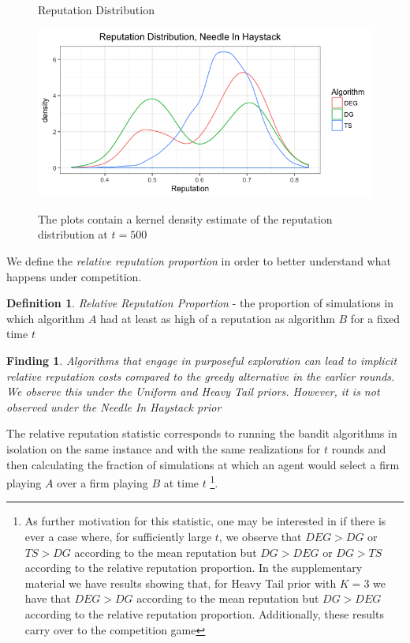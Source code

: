 \documentclass{article}
\theoremstyle{definition}
\newtheorem{definition}{Definition}
\newtheorem{finding}{Finding}
\begin{document}
\begin{figure}
\caption{Reputation Distribution}
\includegraphics[scale=0.35]{figures/rep_distribution_nih}
\label{rep_dist_nih}
\caption*{\tiny{The plots contain a kernel density estimate of the reputation distribution at $t = 500$}}
\end{figure} 


We define the \textit{relative reputation proportion} in order to better understand what happens under competition.

\begin{definition}
\textit{Relative Reputation Proportion} - the proportion of simulations in which algorithm $A$ had at least as high of a reputation as algorithm $B$ for a fixed time $t$
\end{definition}


\begin{finding}
\textit{Algorithms that engage in purposeful exploration can lead to implicit relative reputation costs compared to the greedy alternative in the earlier rounds. We observe this under the Uniform and Heavy Tail priors. However, it is not observed under the Needle In Haystack prior}
\end{finding}

The relative reputation statistic corresponds to running the bandit algorithms in isolation on the same instance and with the same realizations for $t$ rounds and then calculating the fraction of simulations at which an agent would select a firm playing $A$ over a firm playing $B$ at time $t$ \footnote{As further motivation for this statistic, one may be interested in if there is ever a case where, for sufficiently large $t$, we observe that $DEG >DG$ or $TS > DG$ according to the mean reputation but $DG > DEG$ or $DG > TS$ according to the relative reputation proportion. In the supplementary material we have results showing that, for Heavy Tail prior with $K=3$ we have that $DEG > DG$ according to the mean reputation but $DG > DEG$ according to the relative reputation proportion. Additionally, these results carry over to the competition game}.
\end{document}
